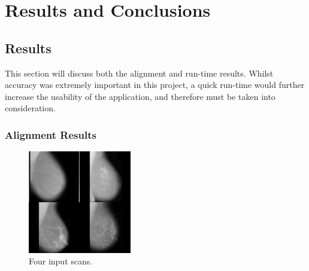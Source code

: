 \chapter{Results and Conclusions}




\section{Results}

This section will discuss both the alignment and run-time results. Whilst accuracy was extremely important in this project, a quick run-time would further increase the usability of the application, and therefore must be taken into consideration.

\subsection{Alignment Results}
\label{ssec:align}

\begin{figure}[H]
  \centering
  \includegraphics[width=0.4\textwidth]{Chapter3/results-img/big_scan.png}
  \caption{Four input scans.}
  \label{fig:input-data}
\end{figure}

